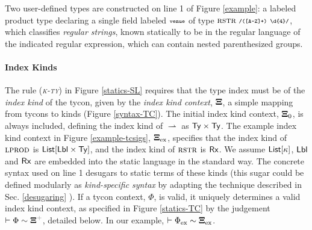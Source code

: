\documentclass[9pt,preprint]{sigplanconf}
\newcommand{\rulename}[1]{({\textsc{\textsl{#1}}})}
\newcommand{\moutput}{^{\color{gray}{+}}}
\begin{document}
Two user-defined types are constructed on line 1 of Figure \ref{example}: a labeled product type declaring a single field labeled $\conclbl{venue}$ of type $\tcvar{rstr}~\concrx{([A-Z]+) \digit\{4\}}$, which classifies \emph{regular strings}, known statically to be in the regular language of the indicated regular expression, which can contain nested parenthesized groups. %

\paragraph{Index Kinds} The rule \rulename{k-ty} in Figure \ref{statics-SL} requires that the type index must be of the \emph{index kind} of the tycon, given by the \emph{index kind context}, $\boldsymbol\Xi$, a simple mapping from tycons to kinds (Figure \ref{syntax-TC}). The initial index kind context, $\boldsymbol\Xi_0$, is always included, defining the index kind of ${\rightharpoonup}$ as ${\sf Ty} \times {\sf Ty}$. 
The example index kind context in Figure \ref{example-tcsigs}, $\boldsymbol\Xi_\text{ex}$, specifies that the index kind of $\textsc{lprod}$ is ${\sf List}[{\sf Lbl}\times{\sf Ty}]$, and the  index kind of $\textsc{rstr}$ is ${\sf Rx}$. We assume ${\sf List}[\kappa]$, ${\sf Lbl}$ and ${\sf Rx}$ are embedded into the static language in the standard way. The concrete syntax used on line 1 desugars to static terms of these kinds (this sugar could be defined modularly as \emph{kind-specific syntax} by adapting the technique described in Sec. \ref{desugaring} \cite{TSLs}). If a tycon context, $\Phi$, is valid, it  uniquely determines a valid index kind context, as specified  in Figure \ref{statics-TC} by the judgement $\tccok{\Phi}{\kXi\moutput}$, detailed below. In our example, $\vdash \Phi_\text{ex} \sim \boldsymbol\Xi_\text{ex}$. 
\end{document}

